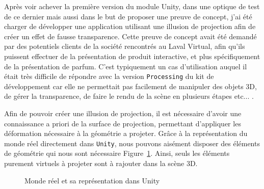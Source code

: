 Après voir achever la première version du module Unity, dans une optique de test de ce dernier mais aussi dans le but de proposer une preuve de concept, j'ai été charger de développer une application utilisant une illusion de projection afin de créer un effet de fausse transparence. Cette preuve de concept avait été demandé par des potentiels clients de la société rencontrés au Laval Virtual, afin qu'ils puissent effectuer de la présentation de produit interactive, et plus spécifiquement de la présentation de parfum. C'est typiquement un cas d'utilisation auquel il était très difficile de répondre avec la version \texttt{Processing} du kit de développement car elle ne permettait pas facilement de manipuler des objets 3D, de gérer la transparence, de faire le rendu de la scène en plusieurs étapes etc... . 

Afin de pouvoir créer une illusion de projection, il est nécessaire d'avoir une connaissance a priori de la surface de projection, permettant d'appliquer les déformation nécessaire à la géométrie a projeter. Grâce à la représentation du monde réel directement dans \texttt{Unity}, nous pouvons aisément disposer des éléments de géométrie qui nous sont nécessaire Figure~\ref{fig:realvsunity}. Ainsi, seuls les éléments purement virtuels à projeter sont à rajouter dans la scène 3D.

\begin{figure}[H]
\centering
\caption{Monde réel et sa représentation dans Unity}
\label{fig:realvsunity}
\end{figure}

